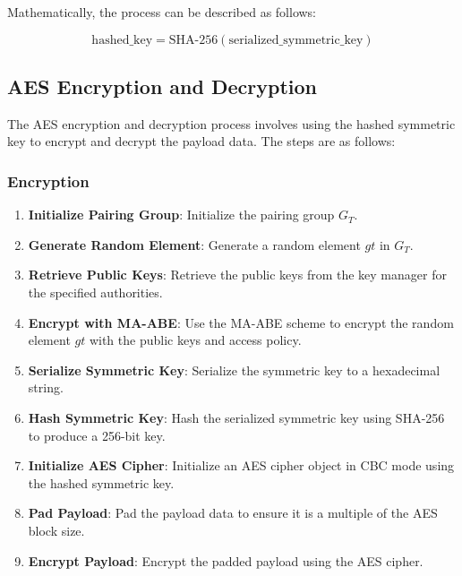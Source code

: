 Mathematically, the process can be described as follows:

\begin{equation}
\text{hashed\_key} = \text{SHA-256}(\text{serialized\_symmetric\_key})
\end{equation}
\subsection{AES Encryption and Decryption}

The AES encryption and decryption process involves using the hashed symmetric key to encrypt and decrypt the payload data. The steps are as follows:

\subsubsection{Encryption}

\begin{enumerate}
    \item \textbf{Initialize Pairing Group}: Initialize the pairing group \(G_T\).
    \item \textbf{Generate Random Element}: Generate a random element \(gt\) in \(G_T\).
    \item \textbf{Retrieve Public Keys}: Retrieve the public keys from the key manager for the specified authorities.
    \item \textbf{Encrypt with MA-ABE}: Use the MA-ABE scheme to encrypt the random element \(gt\) with the public keys and access policy.
    \item \textbf{Serialize Symmetric Key}: Serialize the symmetric key to a hexadecimal string.
    \item \textbf{Hash Symmetric Key}: Hash the serialized symmetric key using SHA-256 to produce a 256-bit key.
    \item \textbf{Initialize AES Cipher}: Initialize an AES cipher object in CBC mode using the hashed symmetric key.
    \item \textbf{Pad Payload}: Pad the payload data to ensure it is a multiple of the AES block size.
    \item \textbf{Encrypt Payload}: Encrypt the padded payload using the AES cipher.
\end{enumerate}

